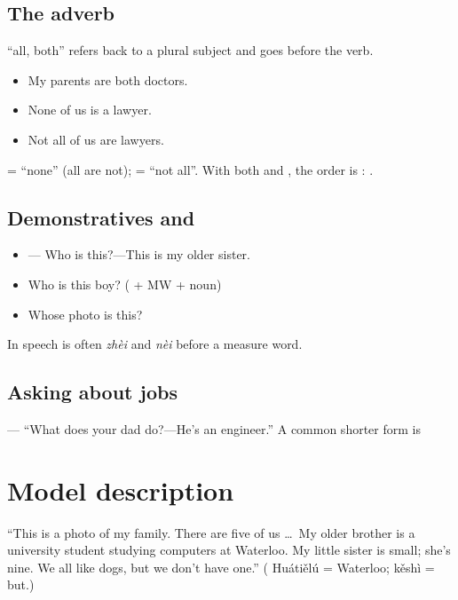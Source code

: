 \subsection{The adverb }

 ``all, both'' refers back to a plural subject and goes before the verb.
\begin{itemize}
  \item {} My parents are both doctors.
  \item {} None of us is a lawyer.
  \item {} Not all of us are lawyers.
\end{itemize}

\begin{important}[\zh{都不} vs \zh{不都}]
 = ``none'' (all are not);  = ``not all''. With both  and
, the order is : .
\end{important}

\subsection{Demonstratives and }

\begin{itemize}
  \item {}--- Who is this?---This is my older sister.
  \item {} Who is this boy? ( + MW + noun)
  \item {} Whose photo is this?
\end{itemize}
In speech  is often \emph{zhèi} and  \emph{nèi} before a measure word.

\subsection{Asking about jobs}

--- ``What does your dad do?---He's an engineer.''
A common shorter form is 

\section{Model description}

\begin{example}

``This is a photo of my family. There are five of us \ldots\ My older brother is a
university student studying computers at Waterloo. My little sister is small; she's nine.
We all like dogs, but we don't have one.''
( Huátiělú = Waterloo;  kěshì = but.)
\end{example}

